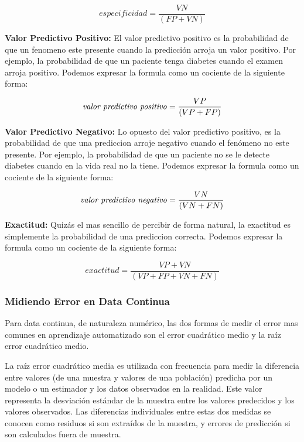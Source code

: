 \begin{equation}
especificidad= \frac{VN}{(FP + VN)}
\end{equation}

\textbf{Valor Predictivo Positivo:} El valor predictivo positivo es la probabilidad de que un fenomeno este presente cuando la predicción arroja un valor positivo. Por ejemplo, la probabilidad de que un paciente tenga diabetes cuando el examen arroja positivo. Podemos expresar la formula como un cociente de la siguiente forma:

\begin{equation}
\mbox{\textit{valor predictivo positivo}} = \frac{VP}{(VP + FP)}
\end{equation}

\textbf{Valor Predictivo Negativo:} Lo opuesto del valor predictivo positivo, es la probabilidad de que una prediccion arroje negativo cuando el fenómeno no este presente. Por ejemplo, la probabilidad de que un paciente no se le detecte diabetes cuando en la vida real no la tiene. Podemos expresar la formula como un cociente de la siguiente forma:

\begin{equation}
\mbox{\textit{valor predictivo negativo}} = \frac{VN}{(VN + FN)}
\end{equation}

\textbf{Exactitud:} Quizás el mas sencillo de percibir de forma natural, la exactitud es simplemente la probabilidad de una prediccion correcta. Podemos expresar la formula como un cociente de la siguiente forma:

\begin{equation}
exactitud = \frac{VP + VN}{(VP + FP + VN + FN)}
\end{equation}

\subsubsection{Midiendo Error en Data Continua}
Para data continua, de naturaleza numérico, las dos formas de medir el error mas comunes en aprendizaje automatizado son el error cuadrático medio y la raíz error cuadrático medio. 

La raíz error cuadrático media es utilizada con frecuencia para medir la diferencia entre valores (de una muestra y valores de una población) predicha por un modelo o un estimador y los datos observados en la realidad. Este valor representa la desviación estándar de la muestra entre los valores predecidos y los valores observados. Las diferencias individuales entre estas dos medidas se conocen como residuos si son extraídos de la muestra, y errores de predicción si son calculados fuera de muestra. 

